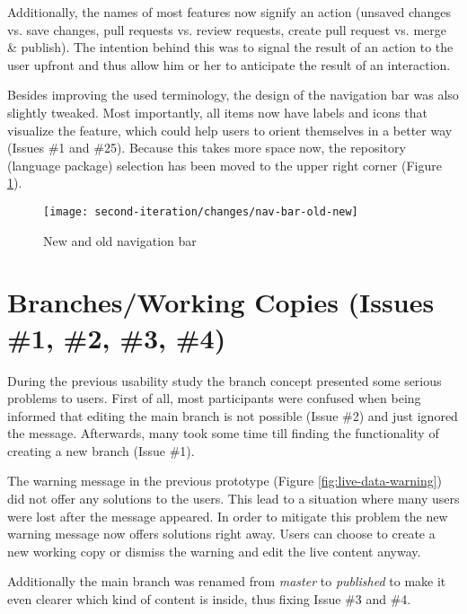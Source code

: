 Additionally, the names of most features now signify an action (unsaved changes vs. save changes, pull requests vs. review requests, create pull request vs. merge \& publish). The intention behind this was to signal the result of an action to the user upfront and thus allow him or her to anticipate the result of an interaction.

Besides improving the used terminology, the design of the navigation bar was also slightly tweaked. Most importantly, all items now have labels and icons that visualize the feature, which could help users to orient themselves in a better way (Issues \#1 and \#25). Because this takes more space now, the repository (language package) selection has been moved to the upper right corner (Figure \ref{fig:nav-bar-old-new}).

\begin{figure}[h!]
 \centering
 \texttt{[image: second-iteration/changes/nav-bar-old-new]}
 \caption{New and old navigation bar}
 \label{fig:nav-bar-old-new}
\end{figure}

\section{Branches/Working Copies (Issues \#1, \#2, \#3, \#4)}
During the previous usability study the branch concept presented some serious problems to users. First of all, most participants were confused when being informed that editing the main branch is not possible (Issue \#2) and just ignored the message. Afterwards, many took some time till finding the functionality of creating a new branch (Issue \#1). 

The warning message in the previous prototype (Figure \ref{fig:live-data-warning}) did not offer any solutions to the users. This lead to a situation where many users were lost after the message appeared. In order to mitigate this problem the new warning message now offers solutions right away. Users can choose to create a new working copy or dismiss the warning and edit the live content anyway.

Additionally the main branch was renamed from \emph{master} to \emph{published} to make it even clearer which kind of content is inside, thus fixing Issue \#3 and \#4.




